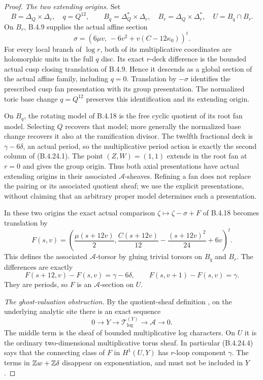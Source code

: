 \begin{proof}
\emph{The two extending origins.}
Set
\[
 B=\Delta_Q\times\Delta_r,\quad q=Q^{12},\qquad
 B_q=\Delta_Q^*\times\Delta_r,\quad
 B_r=\Delta_Q\times\Delta_r^*,\quad U=B_q\cap B_r.
\]
On $B_r$, B.4.9 supplies the actual affine section
\[
 \sigma=
 \left(6\mu v,\,-6v^2+v(C-12\kappa_0)\right)^t.
 \tag{B.4.24.2}
\]
For every local branch of $\log r$, both of its
multiplicative coordinates are holomorphic units
in the full $q$ disc. Its exact $r$-deck difference
is the bounded actual cusp closing translation
of B.4.9. Hence it descends as a global section
of the actual affine family, including $q=0$.
Translation by $-\sigma$ identifies the prescribed
cusp fan presentation with its group presentation.
The normalized toric base change $q=Q^{12}$ preserves
this identification and its extending origin.

On $B_q$, the rotating model of B.4.18 is the
free cyclic quotient of its root fan model. Selecting
$Q$ recovers that model; more generally the normalized
base change recovers it also at the ramification
divisor. The twelfth fractional deck is
$\gamma-6\delta$, an actual period, so the
multiplicative period action is exactly the second
column of (B.4.24.1). The point $(Z,W)=(1,1)$
extends in the root fan at $r=0$ and gives the
group origin. Thus both axial presentations have
actual extending origins in their associated
$\mathcal A$-sheaves. Refining a fan does not
replace the pairing or its associated quotient
sheaf; we use the explicit presentations, without
claiming that an arbitrary proper model determines
such a presentation.

In these two origins the exact actual comparison
$\zeta\mapsto\zeta-\sigma+F$ of B.4.18 becomes
translation by
\[
 F(s,v)=\left(
 \frac{\mu(s+12v)}2,
 \frac{C(s+12v)}{12}-\frac{(s+12v)^2}{24}+6v
 \right)^t.
 \tag{B.4.24.3}
\]
This defines the associated $\mathcal A$-torsor
by gluing trivial torsors on $B_q$ and $B_r$.
The differences are exactly
\[
 F(s+12,v)-F(s,v)=\gamma-6\delta,
 \qquad F(s,v+1)-F(s,v)=\gamma.
 \tag{B.4.24.4}
\]
They are periods, so $F$ is an $\mathcal A$-section
on $U$.

\emph{The ghost-valuation obstruction.}
By the quotient-sheaf definition
\citep[Sections 1.3.1--1.3.4, pp.~81--82]{KKN2008Root},
on the underlying analytic site there is an exact sequence
\[
 0\longrightarrow Y\longrightarrow
 \mathcal T_{\log}^{(Y)}\longrightarrow
 \mathcal A\longrightarrow0.
 \tag{B.4.24.5}
\]
The middle term is the sheaf of bounded multiplicative
log characters. On $U$ it is the ordinary
two-dimensional multiplicative torus sheaf.
In particular (B.4.24.4) says that the connecting
class of $F$ in $H^1(U,Y)$ has $r$-loop component
$\gamma$. The terms in $\mathbb Z w+\mathbb Z\delta$ disappear
on exponentiation, and must not be included in $Y$.


\end{proof}
